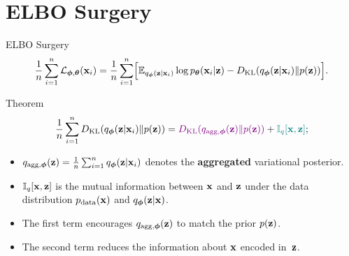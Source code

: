 \documentclass{beamer}
\begin{document}
\section{ELBO Surgery}
\begin{frame}{ELBO Surgery}
	\vspace{-0.3cm}
	\[
	    \frac{1}{n} \sum_{i=1}^n \mathcal{L}_{\boldsymbol{\phi}, \boldsymbol{\theta}}(\mathbf{x}_i) = \frac{1}{n} \sum_{i=1}^n \Bigl[ \mathbb{E}_{q_{\boldsymbol{\phi}}(\mathbf{z}| \mathbf{x}_i)} \log p_{\boldsymbol{\theta}}(\mathbf{x}_i | \mathbf{z}) - D_\mathrm{KL}(q_{\boldsymbol{\phi}}(\mathbf{z}| \mathbf{x}_i) \| p(\mathbf{z})) \Bigr].
	\]
    \eqpause
	\vspace{-0.3cm}
	\begin{block}{Theorem}
		\vspace{-0.5cm}
		\[
		    \frac{1}{n} \sum_{i=1}^n D_\mathrm{KL}(q_{\boldsymbol{\phi}}(\mathbf{z}| \mathbf{x}_i) \| p(\mathbf{z})) = {\color{violet} D_\mathrm{KL}(q_{\text{agg}, \boldsymbol{\phi}}(\mathbf{z}) \| p(\mathbf{z}))} + {\color{teal}\mathbb{I}_{q} [\mathbf{x}, \mathbf{z}]};
		\]
        \eqpause
		\vspace{-0.5cm}
		\begin{itemize}
			\item $q_{\text{agg}, \boldsymbol{\phi}}(\mathbf{z}) = \frac{1}{n} \sum_{i=1}^n q_{\boldsymbol{\phi}}(\mathbf{z}| \mathbf{x}_i)$ denotes the \textbf{aggregated} variational posterior.
			\item $\mathbb{I}_{q} [\mathbf{x}, \mathbf{z}]$ is the mutual information between $\mathbf{x}$ and $\mathbf{z}$ under the data distribution $p_{\text{data}}(\mathbf{x})$ and $q_{\boldsymbol{\phi}}(\mathbf{z}| \mathbf{x})$.
			\item  {\color{violet} The first term} encourages $q_{\text{agg}, \boldsymbol{\phi}}(\mathbf{z})$ to match the prior $p(\mathbf{z})$.
			\item {\color{teal} The second term} reduces the information about $\mathbf{x}$ encoded in~$\mathbf{z}$.
		\end{itemize}
	\end{block}
\end{frame}
\end{document}
